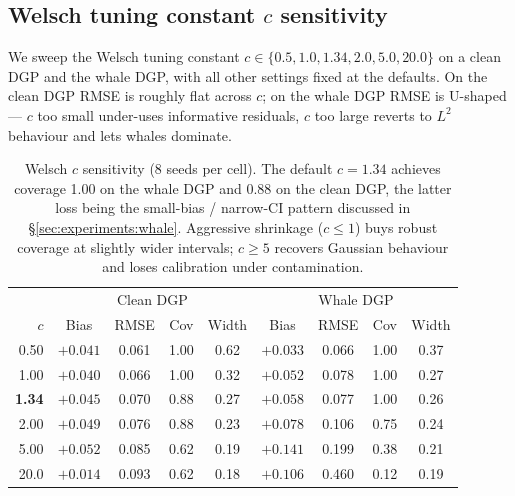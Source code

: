 \subsection{\texorpdfstring{Welsch tuning constant $c$ sensitivity}{Welsch tuning constant c sensitivity}}
\label{app:cwhale}
We sweep the Welsch tuning constant $c \in \{0.5, 1.0, 1.34, 2.0,
5.0, 20.0\}$ on a clean DGP and the whale DGP, with all other
settings fixed at the defaults. On the clean DGP RMSE is roughly
flat across $c$; on the whale DGP RMSE is U-shaped --- $c$ too
small under-uses informative residuals, $c$ too large reverts to
$L^2$ behaviour and lets whales dominate.

\begin{table}[!t]
\centering
\small
\begin{tabular}{r|cccc|cccc}
\toprule
 & \multicolumn{4}{c|}{Clean DGP} & \multicolumn{4}{c}{Whale DGP} \\
$c$ & Bias & RMSE & Cov & Width & Bias & RMSE & Cov & Width \\
\midrule
0.50  & $+0.041$ & 0.061 & 1.00 & 0.62 & $+0.033$ & 0.066 & 1.00 & 0.37 \\
1.00  & $+0.040$ & 0.066 & 1.00 & 0.32 & $+0.052$ & 0.078 & 1.00 & 0.27 \\
\textbf{1.34}  & $+0.045$ & 0.070 & 0.88 & 0.27 & $+0.058$ & 0.077 & 1.00 & 0.26 \\
2.00  & $+0.049$ & 0.076 & 0.88 & 0.23 & $+0.078$ & 0.106 & 0.75 & 0.24 \\
5.00  & $+0.052$ & 0.085 & 0.62 & 0.19 & $+0.141$ & 0.199 & 0.38 & 0.21 \\
20.0  & $+0.014$ & 0.093 & 0.62 & 0.18 & $+0.106$ & 0.460 & 0.12 & 0.19 \\
\bottomrule
\end{tabular}
\caption{Welsch $c$ sensitivity (8 seeds per cell). The default
$c = 1.34$ achieves coverage 1.00 on the whale DGP and 0.88 on the
clean DGP, the latter loss being the small-bias / narrow-CI pattern
discussed in \S\ref{sec:experiments:whale}. Aggressive
shrinkage ($c \le 1$) buys robust coverage at slightly wider
intervals; $c \ge 5$ recovers Gaussian behaviour and loses
calibration under contamination.}
\label{tab:cwhale_sensitivity}
\end{table}

